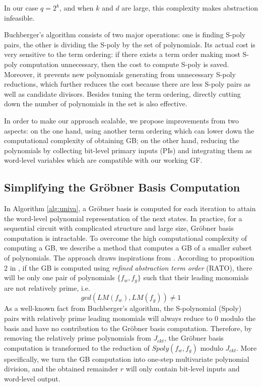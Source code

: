 In our case $q = 2^k$, and when $k$ and $d$ are large, this complexity 
makes abstraction infeasible.

Buchberger's algorithm consists of two major operations: one is finding 
S-poly pairs, the other is dividing the S-poly by the set of polynomials.
Its actual cost is very sensitive to the term ordering: if there exists 
a term order making most S-poly computation unnecessary, then the cost to 
compute S-poly is saved. Moreover, it prevents new polynomials generating 
from unnecessary S-poly reductions, which further reduces the cost
because there are less S-poly pairs as well as candidate divisors.
Besides tuning the term ordering, directly cutting down the number of 
polynomials in the set is also effective.

In order to make our approach scalable, we propose improvements from 
two aspects: on the one hand, using another term ordering which can lower down the 
computational complexity of obtaining GB; on the other hand, reducing the 
polynomials by collecting bit-level primary inputs (PIs) and integrating them as word-level 
variables which are compatible with our working GF.

\subsection{Simplifying the Gr\"obner Basis Computation}
In Algorithm \ref{alg:univa}, a Gr\"obner basis is computed for each
iteration to attain the word-level polynomial representation of the next states. In practice, for 
a sequential circuit with complicated structure and large size, Gr\"obner basis computation
is intractable. To overcome the high computational complexity of computing a GB, 
we describe a method that computes a GB of a smaller subset of polynomials.
The approach draws inspirations from \cite{pruss:tcad15}. 
According to proposition 2 in \cite{pruss:tcad15}, if the GB is computed using {\it refined abstraction term
order} (RATO), there will be only one pair of polynomials $\{f_w,f_g\}$ such that 
their leading monomials are not relatively prime, i.e. 
$$gcd(LM(f_w), LM(f_g)) \neq 1$$
As a well-known fact from Buchberger's algorithm, the S-polynomial 
(Spoly) pairs with relatively prime 
leading monomials will always reduce to 0 modulo the basis and have no contribution to 
the Gr\"obner basis computation.
Therefore, by removing the relatively prime polynomials from $J_{ckt}$, 
the Gr\"obner basis computation is transformed to the reduction of 
$Spoly(f_w,f_g)$ modulo $J_{ckt}$. More specifically, we turn the
GB computation into one-step multivariate polynomial division, and the obtained
remainder $r$ will only contain bit-level inputs and word-level output. 


